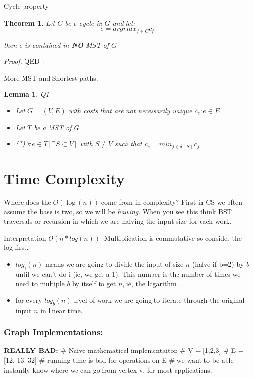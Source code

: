 \documentclass{article}
\newtheorem{theorem}{Theorem}
\newtheorem{lemma}{Lemma}
\begin{document}
\begin{greenbox}{Cycle property}
\begin{theorem}
Let $C$ be a cycle in $G$ and let:
\[ e = argmax_{f \in C} c_f\]

then $e$ is contained in \textbf{NO} MST of $G$
\end{theorem}
\end{greenbox}

\begin{proof}
QED
\end{proof}

More MST and Shortest paths. 

\begin{lemma} Q1
\begin{itemize}
\item Let $G = (V, E)$ with costs that are not necessarily unique $c_e : e \in E$. 
\item Let $T$ be a MST of $G$
\item (*) $\forall e \in T[\exists S \subset V]$ with $S\neq V$ such that $c_e = min_{f\in \delta(S)}c_f$
\end{itemize}
\end{lemma}


\section{Time Complexity}
Where does the $O(\log(n))$ come from in complexity?
First in CS we often assume the base is two, so we will be \textit{halving}. When you see this think BST traversals or recursion in which we are halving the input size for each work.

Interpretation $O(n*log(n))$: Multiplication is commutative so consider the log first. 
\begin{itemize}
\item $log_b(n)$ means we are going to divide the input of size $n$ (halve if b=2) by $b$ until we can't do i (ie, we get a 1). This number is the number of times we need to multiple $b$ by itself to get $n$, ie, the logarithm. 
\item for every $log_b(n)$ level of work we are going to iterate through the original input $n$ in linear time. 
\end{itemize}

\subsubsection{Graph Implementations:}
\textbf{REALLY BAD:}
# Naive mathematical implementaiton
#    V = [1,2,3]
#    E = [12, 13, 32]
# running time is bad for operations on E
# we want to be able instantly know where we can go from vertex v, for most applications. 
\end{document}
